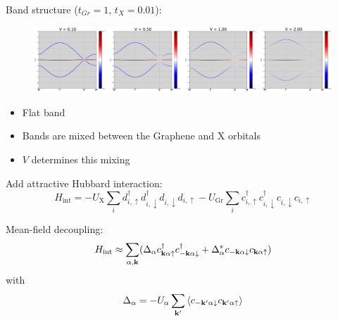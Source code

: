 \documentclass[aspectratio=169]{beamer}
\begin{document}
\begin{frame}
	Band structure (\(t_{Gr} = 1\), \(t_{X} = 0.01\)):
	
	\begin{figure}
		\includegraphics[width=\textwidth]{figs/EG_X bands_tGr_1_tX_0.01}
	\end{figure}\pause
	
	\begin{itemize}
		\item Flat band
		\item Bands are mixed between the Graphene and X orbitals
		\item \(V\) determines this mixing
	\end{itemize}
\end{frame}


\begin{frame}
	Add attractive Hubbard interaction:
	\begin{equation}
		H_{\mathrm{int}} = -U_{\mathrm{X}} \sum_{i} d_{i, \uparrow}^{\dagger} d_{i, \downarrow}^{\dagger} d_{i, \downarrow} d_{i, \uparrow}
		- U_{\mathrm{Gr}} \sum_{i} c_{i, \uparrow}^{\dagger} c_{i, \downarrow}^{\dagger} c_{i, \downarrow} c_{i, \uparrow}
	\end{equation}\pause

	Mean-field decoupling:
	\begin{align}
		H_{\mathrm{int}} \approx \sum_{\alpha, \mathbf{k}} (\Delta_{\alpha} c_{\mathbf{k} \alpha \uparrow}^{\dagger} c_{-\mathbf{k} \alpha \downarrow}^{\dagger} + \Delta_{\alpha}^* c_{-\mathbf{k} \alpha \downarrow} c_{\mathbf{k} \alpha \uparrow})
	\end{align}
	with
	\begin{equation}
		\Delta_{\alpha} = - U_{\alpha} \sum_{\mathbf{k}^{\prime}} \braket{c_{-\mathbf{k}^{\prime} \alpha \downarrow} c_{\mathbf{k}^{\prime} \alpha \uparrow}}
	\end{equation}
\end{frame}
\end{document}

